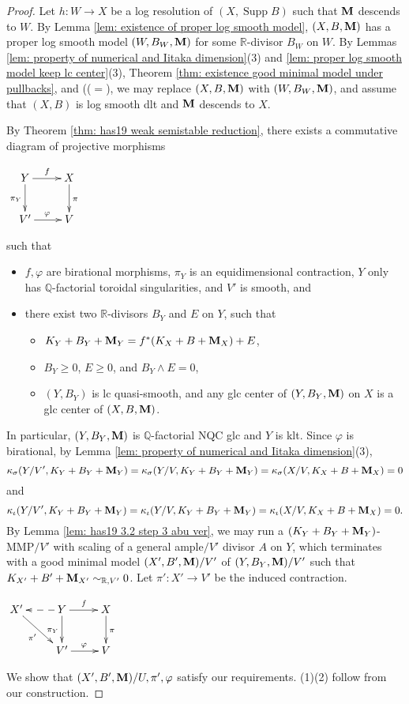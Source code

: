 \documentclass[11pt]{amsart}
\numberwithin{equation}{section}
\newcommand{\Mm}{{\bf{M}}}
\newcommand{\Qq}{\mathbb{Q}}
\newcommand{\Rr}{\mathbb{R}}
\newcommand{\Supp}{\operatorname{Supp}}
\theoremstyle{definition}
\theoremstyle{definition}
\theoremstyle{definition}
\begin{document}
\begin{proof} Let $h: W\rightarrow X$ be a log resolution of $(X,\Supp B)$ such that $\Mm$ descends to $W$. 
By Lemma \ref{lem: existence of proper log smooth model}, $(X,B,\Mm)$ has a proper log smooth model $(W,B_W,\Mm)$ for some $\Rr$-divisor $B_W$ on $W$. By Lemmas \ref{lem: property of numerical and Iitaka dimension}(3) and \ref{lem: proper log smooth model keep lc center}(3), Theorem \ref{thm: existence good minimal model under pullbacks}, and \cite[Lemmas 3.6, 3.10]{HL21} (($=$\cite[Version 3, Lemmas 3.10, 3.17]{HL21}), we may replace $(X,B,\Mm)$ with $(W,B_W,\Mm)$, and assume that $(X,B)$ is log smooth dlt and $\Mm$ descends to $X$. 

By Theorem \ref{thm: has19 weak semistable reduction}, there exists a commutative diagram of projective morphisms
\begin{center}$\xymatrix{
Y\ar@{->}[r]^{f}\ar@{->}[d]_{\pi_Y} & X\ar@{->}[d]^{\pi}\\
V'\ar@{->}[r]^{\varphi} & V
}$
\end{center}
such that
\begin{itemize}
    \item $f,\varphi$ are birational morphisms, $\pi_Y$ is an equidimensional contraction, $Y$ only has $\Qq$-factorial toroidal singularities, and $V'$ is smooth, and
    \item there exist two $\Rr$-divisors $B_Y$ and $E$ on $Y$, such that
    \begin{itemize}
    \item $K_Y+B_Y+\Mm_Y=f^*(K_X+B+\Mm_X)+E$,
    \item $B_Y\geq 0$, $E\geq 0$, and $B_Y\wedge E=0$,
    \item $(Y,B_Y)$ is lc quasi-smooth, and any glc center of $(Y,B_Y,\Mm)$ on $X$ is a glc center of $(X,B,\Mm)$.
    \end{itemize}
\end{itemize}
In particular, $(Y,B_Y,\Mm)$ is $\Qq$-factorial NQC glc and $Y$ is klt. Since $\varphi$ is birational, by Lemma \ref{lem: property of numerical and Iitaka dimension}(3), $$\kappa_{\sigma}(Y/V',K_Y+B_Y+\Mm_Y)=\kappa_{\sigma}(Y/V,K_Y+B_Y+\Mm_Y)=\kappa_{\sigma}(X/V,K_X+B+\Mm_X)=0$$
and
$$\kappa_{\iota}(Y/V',K_Y+B_Y+\Mm_Y)=\kappa_{\iota}(Y/V,K_Y+B_Y+\Mm_Y)=\kappa_{\iota}(X/V,K_X+B+\Mm_X)=0.$$
By Lemma \ref{lem: has19 3.2 step 3 abu ver}, we may run a $(K_Y+B_Y+\Mm_Y)$-MMP$/V'$ with scaling of a general ample$/V'$ divisor $A$ on $Y$, which terminates with a good minimal model $(X',B',\Mm)/V'$ of $(Y,B_Y,\Mm)/V'$ such that $K_{X'}+B'+\Mm_{X'}\sim_{\Rr,V'}0$. Let $\pi': X'\rightarrow V'$ be the induced contraction. 
\begin{center}$\xymatrix{
X'\ar@{->}[dr]_{\pi'}& Y\ar@{-->}[l]\ar@{->}[r]^{f}\ar@{->}[d]_{\pi_Y} & X\ar@{->}[d]^{\pi}\\
& V'\ar@{->}[r]^{\varphi} & V
}$
\end{center}
We show that $(X',B',\Mm)/U,\pi',\varphi$ satisfy our requirements. (1)(2) follow from our construction. 


\end{proof}
\end{document}
